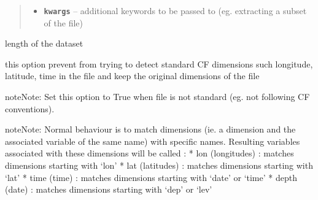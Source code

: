 \documentclass[letterpaper,10pt,english]{sphinxmanual}
\begin{document}
\begin{fulllineitems}
\begin{fulllineitems}
\begin{quote}
\begin{description}
\begin{itemize}
\item {} 
\textbf{\texttt{kwargs}} -- additional keywords to be passed to {\hyperref[altimetry.tools.nctools:altimetry.tools.nctools.nc.load]{\emph{}}} (eg. extracting a subset of the file)

\end{itemize}

\end{description}\end{quote}

\end{fulllineitems}


\begin{fulllineitems}
\label{altimetry.tools.nctools:altimetry.tools.nctools.nc.size}
length of the dataset

\end{fulllineitems}


\begin{fulllineitems}
\label{altimetry.tools.nctools:altimetry.tools.nctools.nc.use_local_dims}
this option prevent from trying to detect standard CF dimensions such longitude, latitude, time in the file and keep the original dimensions of the file

\begin{notice}{note}{Note:}
Set this option to True when file is not standard (eg. not following CF conventions).
\end{notice}

\begin{notice}{note}{Note:}
Normal behaviour is to match dimensions (ie. a dimension and the associated variable of the same name) with specific names. Resulting variables associated with these dimensions will be called :
* lon (longitudes) : matches dimensions starting with `lon'
* lat (latitudes) : matches dimensions starting with `lat'
* time (time) : matches dimensions starting with `date' or `time'
* depth (date) : matches dimensions starting with `dep' or `lev'
\end{notice}

\end{fulllineitems}



\end{fulllineitems}
\end{document}
